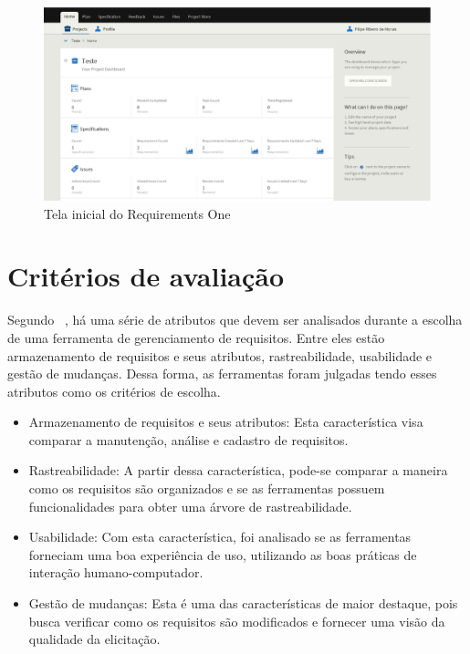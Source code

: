 \begin{figure}[htb]
\centering
  \includegraphics[keepaspectratio=true,scale=0.4]
  {figuras/requirements_one.eps}
  \caption{Tela inicial do Requirements One}
  \label{requirements-one-pic}
\end{figure}

\clearpage{}

\section{Critérios de avaliação}

Segundo ~\cite{beatty}, há uma série de atributos que devem ser analisados durante a escolha de uma ferramenta de gerenciamento de requisitos. Entre eles estão armazenamento de requisitos e seus atributos, rastreabilidade, usabilidade e gestão de mudanças. Dessa forma, as ferramentas foram julgadas tendo esses atributos como os critérios de escolha.

\begin{itemize}
\item Armazenamento de requisitos e seus atributos: Esta característica visa comparar a manutenção, análise e cadastro de requisitos.
\item Rastreabilidade: A partir dessa característica, pode-se comparar a maneira como os requisitos são organizados e se as ferramentas possuem funcionalidades para obter uma árvore de rastreabilidade.
\item Usabilidade: Com esta característica, foi analisado se as ferramentas forneciam uma boa experiência de uso, utilizando as boas práticas de interação humano-computador.
\item Gestão de mudanças: Esta é uma das características de maior destaque, pois busca verificar como os requisitos são modificados e fornecer uma visão da qualidade da elicitação.
\end{itemize}

